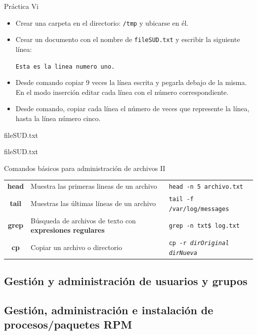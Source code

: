 \documentclass{beamer}
\begin{document}
\begin{frame}{Práctica Vi}
\begin{itemize}
    \item Crear una carpeta en el directorio: \texttt{/tmp} y ubicarse en él.
    \item Crear un documento con el nombre de \texttt{fileSUD.txt} y escribir la siguiente línea:
    \begin{center}
        \texttt{Esta es la linea numero uno.}
    \end{center}
    \item Desde comando copiar 9 veces la línea escrita y pegarla debajo de la misma. En el modo inserción editar cada línea con el número correspondiente.
    \item Desde comando, copiar cada línea el número de veces que represente la línea, hasta la línea número cinco.
\end{itemize}
\end{frame}
\begin{frame}{fileSUD.txt}

\end{frame}

\begin{frame}{fileSUD.txt}



\end{frame}
\begin{frame}{Comandos básicos para administración de archivos II}
\scriptsize
\begin{tabular}{c|p{5cm}|l}
\hline
\textbf{head} & Muestra las primeras lineas de un archivo   & \texttt{head -n 5 archivo.txt}\\
\textbf{tail}  & Muestras las últimas líneas de un archivo  & \texttt{tail -f /var/log/messages}\\
\textbf{grep} & Búsqueda de archivos de texto con \textbf{expresiones regulares}   &\texttt{grep -n txt\$ log.txt}\\
\textbf{cp} & Copiar un archivo o directorio  & \texttt{cp -r \textit{dirOriginal} \textit{dirNueva}}
\end{tabular}
    
\end{frame}

\subsection{Gestión y administración de usuarios y grupos}
\subsection{Gestión, administración e instalación de procesos/paquetes RPM}
\end{document}
